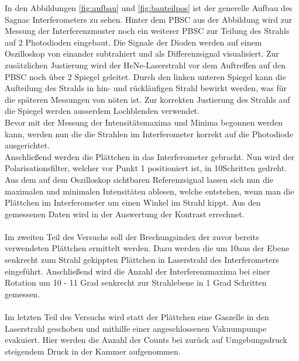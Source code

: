   In den Abbildungen \ref{fig:aufbau} und \ref{fig:bauteilpos} ist der generelle Aufbau des Sagnac Interferometers zu sehen. Hinter dem PBSC aus der Abbildung wird
  zur Messung der Interferenzmuster noch ein weiterer PBSC zur Teilung des Strahls auf 2 Photodioden eingebaut. Die Signale der Dioden werden auf einem Oszilloskop von einander subtrahiert und
  als Differenzsignal visualisiert.
  Zur zusätzlichen Justierung wird der HeNe-Laserstrahl vor dem Auftreffen auf den PBSC noch über 2 Spiegel geleitet. Durch den linken unteren Spiegel kann die Aufteilung des Strahls in hin- und rückläufigen
  Strahl bewirkt werden, was für die späteren Messungen von nöten ist. Zur korrekten Justierung des Strahls auf die Spiegel werden ausserdem Lochblenden verwendet.\\
  Bevor mit der Messung der Intensitätsmaxima und Minima begonnen werden kann, werden nun die die Strahlen im Interferometer korrekt auf die Photodiode
  ausgerichtet.\\
  Anschließend werden die Plättchen in das Interferometer gebracht. Nun wird der Polarisationsfilter, welcher vor Punkt 1 positioniert ist,
  in 10\circ Schritten gedreht. Aus dem auf dem Oszilloskop sichtbaren Referenzsignal lassen sich nun die maximalen und minimalen Intensitäten ablesen, welche entstehen, wenn
  man die Plättchen im Interferometer um einen Winkel im Strahl kippt. Aus den gemessenen Daten wird in der Auswertung der Kontrast errechnet.\\
  \\
  Im zweiten Teil des Versuchs soll der Brechungsindex der zuvor bereits verwendeten Plättchen ermittelt werden. Dazu werden die um 10\circ aus der Ebene senkrecht zum Strahl gekippten Plättchen in Laserstrahl des Interferometers eingeführt.
  Anschließend wird die Anzahl der Interferenzmaxima bei einer Rotation um 10 - 11 Grad senkrecht zur Strahlebene in 1 Grad Schritten gemessen.\\
  \\
  Im letzten Teil des Versuchs wird statt der Plättchen eine Gaszelle in den Laserstrahl geschoben und mithilfe einer angeschlossenen Vakuumpumpe evakuiert.
  Hier werden die Anzahl der Counts bei zurück auf Umgebungsdruck steigendem Druck in der Kammer aufgenommen.

